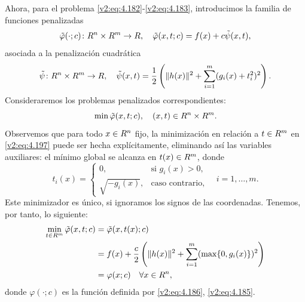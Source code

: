Ahora, para el problema \eqref{v2:eq:4.182}-\eqref{v2:eq:4.183}, introducimos la familia de funciones penalizadas
\begin{equation}
    \tilde{\varphi}(\cdot; c) \colon R^n \times R^m \to R, \quad \tilde{\varphi}(x, t; c) = f(x) + c\tilde{\psi}(x, t),
    \label{v2:eq:4.195}
\end{equation}
asociada a la penalización cuadrática
\begin{equation}
    \tilde{\psi} \colon R^n \times R^m \to R, \quad \tilde{\psi}(x, t) = \frac{1}{2} \left( \|h(x)\|^2 + \sum_{i=1}^m (g_i(x) + t_i^2)^2 \right).
    \label{v2:eq:4.196}
\end{equation}
Consideraremos los problemas penalizados correspondientes:
\begin{equation}
    \min \tilde{\varphi}(x, t; c), \quad (x, t) \in R^n \times R^m.
    \label{v2:eq:4.197}
\end{equation}
Observemos que para todo $x \in R^n$ fijo, la minimización en relación a $t \in R^m$ en \eqref{v2:eq:4.197} puede ser hecha explícitamente, eliminando así las variables auxiliares: el mínimo global se alcanza en $t(x) \in R^m$, donde
\begin{equation}
    t_i(x) = \begin{cases}
        0, & \text{si } g_i(x) > 0, \\
        \sqrt{-g_i(x)}, & \text{caso contrario,}
    \end{cases} \quad i = 1, \dots, m.
    \label{v2:eq:4.198}
\end{equation}
Este minimizador es único, si ignoramos los signos de las coordenadas. Tenemos, por tanto, lo siguiente:
\begin{align*}
    \min_{t \in R^m} \tilde{\varphi}(x, t; c) &= \tilde{\varphi}(x, t(x); c) \\
    &= f(x) + \frac{c}{2} \left( \|h(x)\|^2 + \sum_{i=1}^m (\max\{0, g_i(x)\})^2 \right) \\
    &= \varphi(x; c) \quad \forall x \in R^n,
\end{align*}
donde $\varphi(\cdot; c)$ es la función definida por \eqref{v2:eq:4.186}, \eqref{v2:eq:4.185}.



